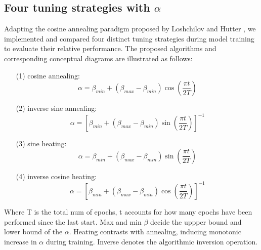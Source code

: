 \documentclass[10pt,twocolumn,letterpaper]{article}
\begin{document}
\subsection{Four tuning strategies with $\alpha$}
\label{subsec:3.5}
Adapting the cosine annealing paradigm proposed by Loshchilov and Hutter \cite{loshchilov2017sgdrstochasticgradientdescent}, we implemented and compared four distinct tuning strategies during model training to evaluate their relative performance. The proposed algorithms and corresponding conceptual diagrams are illustrated as follows:
\begin{enumerate}
    \item[(1)] cosine annealing: 
	\[\alpha = \beta_{min} + (\beta_{max}-\beta_{min})\cos(\frac{\pi t}{2T})\]
    \item[(2)] inverse sine annealing: 
	\[\alpha = \left[\beta_{min} + (\beta_{max}-\beta_{min})\sin(\frac{\pi t}{2T})\right]^{-1}\]
    \item[(3)] sine heating: 
	\[\alpha = \beta_{min} + (\beta_{max}-\beta_{min})\sin(\frac{\pi t}{2T})\]
    \item[(4)] inverse cosine heating: 
	\[\alpha = \left[\beta_{min} + (\beta_{max}-\beta_{min})\cos(\frac{\pi t}{2T})\right]^{-1}\]
\end{enumerate}
Where T is the total num of epochs, t accounts for how many epochs have been performed since the last start. Max and min $\beta$ decide the uppper bound and lower bound of the $\alpha$. Heating contrasts with annealing, inducing monotonic increase in $\alpha$ during training. Inverse denotes the algorithmic inversion operation.
\end{document}
